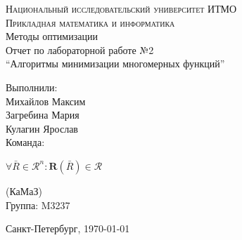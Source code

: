 



\begin{titlepage}
    \begin{center}
        \textsc{Национальный исследовательский университет ИТМО\\
            Прикладная математика и информатика}\\[5cm]

        \huge{Методы оптимизации\\[6mm]
            \large Отчет по лабораторной работе №2\\
            ``Алгоритмы минимизации многомерных функций''\\[4cm]
           
        }
    \end{center}

    \begin{flushright}
        \begin{minipage}{0.25\textwidth}
            Выполнили:\\[2mm]
            Михайлов Максим\\
            Загребина Мария\\
            Кулагин Ярослав\\[2mm]
            Команда:

            \(\forall \bar R \in \mathscr{R}^n : \mathrm{\textbf{R}}(\bar R) \in \mathscr{R}\)

            (КаМаЗ)\\[2mm]
            Группа: M3237
        \end{minipage}
    \end{flushright}

    \vfill
    \begin{center}
        Санкт-Петербург, \today
    \end{center}
\end{titlepage}



